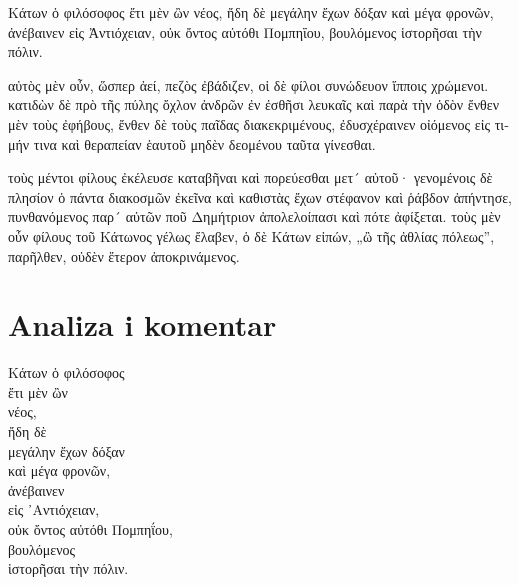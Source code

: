 {\large

\begin{greek}

\noindent  Κάτων ὁ φιλόσοφος ἔτι μὲν ὢν νέος, ἤδη δὲ μεγάλην ἔχων δόξαν καὶ μέγα φρονῶν, ἀνέβαινεν εἰς Ἀντιόχειαν, οὐκ ὄντος αὐτόθι Πομπηΐου, βουλόμενος ἱστορῆσαι τὴν πόλιν.

\noindent αὐτὸς μὲν οὖν, ὥσπερ ἀεί, πεζὸς ἐβάδιζεν, οἱ δὲ φίλοι συνώδευον ἵπποις χρώμενοι. κατιδὼν δὲ πρὸ τῆς πύλης ὄχλον ἀνδρῶν ἐν ἐσθῆσι λευκαῖς καὶ παρὰ τὴν ὁδὸν ἔνθεν μὲν τοὺς ἐφήβους, ἔνθεν δὲ τοὺς παῖδας διακεκριμένους, ἐδυσχέραινεν οἰόμενος εἰς τιμήν τινα καὶ θεραπείαν ἑαυτοῦ μηδὲν δεομένου ταῦτα γίνεσθαι.

\noindent τοὺς μέντοι φίλους ἐκέλευσε καταβῆναι καὶ πορεύεσθαι μετ´ αὐτοῦ· γενομένοις δὲ πλησίον ὁ πάντα διακοσμῶν ἐκεῖνα καὶ καθιστὰς ἔχων στέφανον καὶ ῥάβδον ἀπήντησε, πυνθανόμενος παρ´ αὐτῶν ποῦ Δημήτριον ἀπολελοίπασι καὶ πότε ἀφίξεται. τοὺς μὲν οὖν φίλους τοῦ Κάτωνος γέλως ἔλαβεν, ὁ δὲ Κάτων εἰπών, „ὢ τῆς ἀθλίας πόλεως”, παρῆλθεν, οὐδὲν ἕτερον ἀποκρινάμενος.

\end{greek}

}


\section*{Analiza i komentar}


{\large
\begin{greek}
\noindent Κάτων ὁ φιλόσοφος \\
\tabto{2em} ἔτι μὲν ὢν \\
\tabto{4em} νέος, \\
\tabto{2em} ἤδη δὲ \\
\tabto{4em} μεγάλην ἔχων δόξαν \\
\tabto{2em} καὶ μέγα φρονῶν, \\
ἀνέβαινεν \\

\tabto{2em} εἰς ᾿Αντιόχειαν, \\
οὐκ ὄντος αὐτόθι Πομπηΐου, \\
βουλόμενος \\
\tabto{2em} ἱστορῆσαι τὴν πόλιν. \\

\end{greek}
}

